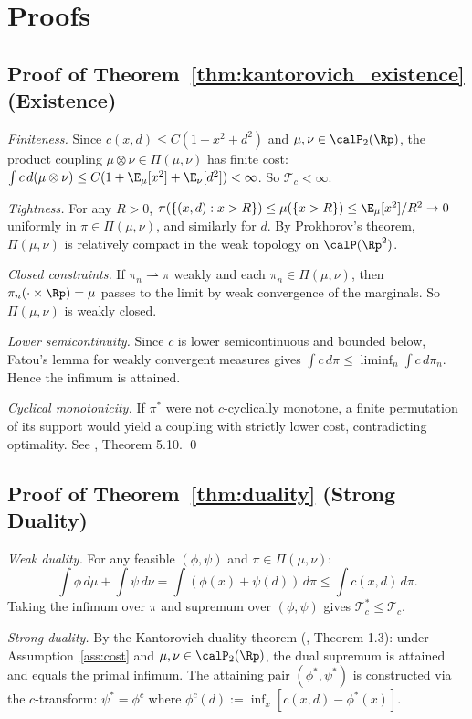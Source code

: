 \section{Proofs}
\label{app:proofs}

\subsection*{Proof of Theorem~\ref{thm:kantorovich_existence} (Existence)}

\emph{Finiteness.} Since $c(x,d) \leq C(1+x^2+d^2)$ and $\mu,\nu \in \calP_2(\Rp)$, the product coupling $\mu \otimes \nu \in \Pi(\mu,\nu)$ has finite cost: $\int c\,d(\mu\otimes\nu) \leq C(1+\E_\mu[x^2]+\E_\nu[d^2]) < \infty$. So $\mathcal{T}_c < \infty$.

\emph{Tightness.} For any $R > 0$, $\pi(\{(x,d): x > R\}) \leq \mu(\{x>R\}) \leq \E_\mu[x^2]/R^2 \to 0$ uniformly in $\pi \in \Pi(\mu,\nu)$, and similarly for $d$. By Prokhorov's theorem, $\Pi(\mu,\nu)$ is relatively compact in the weak topology on $\calP(\Rp^2)$.

\emph{Closed constraints.} If $\pi_n \rightharpoonup \pi$ weakly and each $\pi_n \in \Pi(\mu,\nu)$, then $\pi_n(\cdot \times \Rp) = \mu$ passes to the limit by weak convergence of the marginals. So $\Pi(\mu,\nu)$ is weakly closed.

\emph{Lower semicontinuity.} Since $c$ is lower semicontinuous and bounded below, Fatou's lemma for weakly convergent measures gives $\int c\,d\pi \leq \liminf_n \int c\,d\pi_n$. Hence the infimum is attained.

\emph{Cyclical monotonicity.} If $\pi^*$ were not $c$-cyclically monotone, a finite permutation of its support would yield a coupling with strictly lower cost, contradicting optimality. See \citet{villani2003topics}, Theorem 5.10. \qed

\subsection*{Proof of Theorem~\ref{thm:duality} (Strong Duality)}

\emph{Weak duality.} For any feasible $(\phi,\psi)$ and $\pi \in \Pi(\mu,\nu)$:
\[
  \int \phi\,d\mu + \int \psi\,d\nu = \int (\phi(x)+\psi(d))\,d\pi \leq \int c(x,d)\,d\pi.
\]
Taking the infimum over $\pi$ and supremum over $(\phi,\psi)$ gives $\mathcal{T}_c^* \leq \mathcal{T}_c$.

\emph{Strong duality.} By the Kantorovich duality theorem (\citet{villani2003topics}, Theorem 1.3): under Assumption~\ref{ass:cost} and $\mu,\nu \in \calP_2(\Rp)$, the dual supremum is attained and equals the primal infimum. The attaining pair $(\phi^*,\psi^*)$ is constructed via the $c$-transform: $\psi^* = \phi^{c}$ where $\phi^c(d) := \inf_x [c(x,d)-\phi^*(x)]$.

